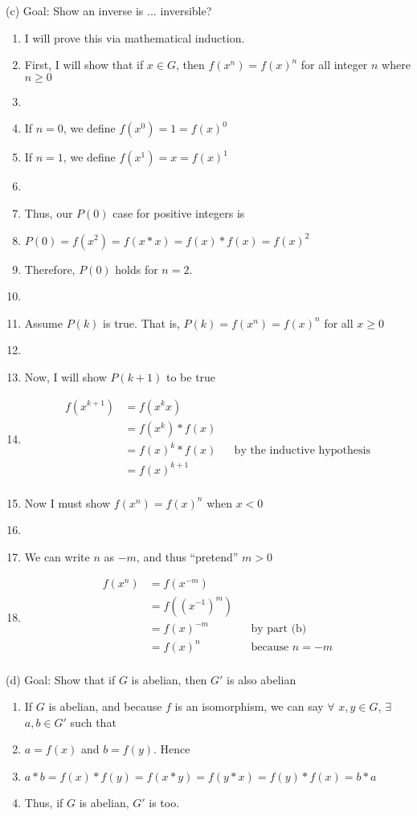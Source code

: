 (c) Goal: Show an inverse is ... inversible? 
\begin{enumerate}[nosep]
\item[] I will prove this via mathematical induction.
\item[] First, I will show that if $x \in G$, then $f(x^n) = f(x)^n$ for all integer $n$ where $n \geq 0$
\item[]
\item[] If $n=0$, we define $f(x^0) = 1 = f(x)^0$
\item[] If $n=1$, we define $f(x^1) = x = f(x)^1$
\item[]
\item[] Thus, our $P(0)$ case for positive integers is
\item[] \hspace{1cm} $P(0) = f(x^2) = f(x * x) = f(x) * f(x) = f(x)^2$
\item[] Therefore, $P(0)$ holds for $n=2$.
\item[]
\item[] Assume $P(k)$ is true. That is, $P(k) = f(x^n) = f(x)^n$ for all $x \geq 0$
\item[]
\item[] Now, I will show $P(k+1)$ to be true
\item[] \begin{align*}
  f(x^{k+1}) &= f(x^kx) \\
  &= f(x^k) * f(x)     \\
  &= f(x)^k * f(x)     & &\text{by the inductive hypothesis} \\
  &= f(x)^{k+1} \\
\end{align*}
\item[] Now I must show $f(x^n) = f(x)^n$ when $x < 0$
\item[]
\item[] We can write $n$ as $-m$, and thus ``pretend'' $m > 0$
\item[] \begin{align*}
  f(x^n) &= f(x^{-m}) \\
  &= f((x^{-1})^m) \\
  &= f(x)^{-m} & &\text{by part (b)} \\
  &= f(x)^n   & &\text{because $n = -m$} \\
\end{align*}
\end{enumerate}

(d) Goal: Show that if $G$ is abelian, then $G'$ is also abelian
\begin{enumerate}[nosep]
\item[] If $G$ is abelian, and because $f$ is an isomorphism, we can say
  $\forall$ $x,y \in G$, $\exists$ $a,b \in G'$ such that
\item[] $a = f(x)$ and $b = f(y)$. Hence
\item[] $a * b = f(x) * f(y) = f(x * y) = f(y * x) = f(y) * f(x) = b * a$
\item[] Thus, if $G$ is abelian, $G'$ is too.
\end{enumerate}

